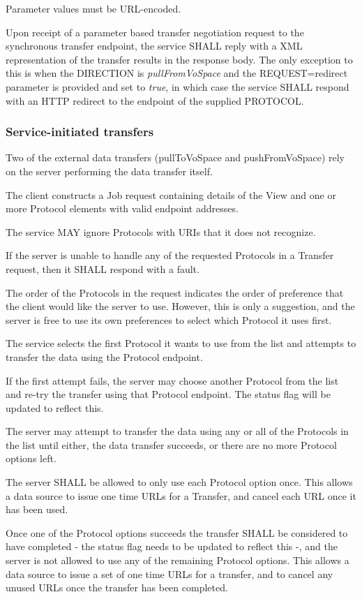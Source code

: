 \documentclass[11pt,a4paper]{ivoa}
\begin{document}
Parameter values must be URL-encoded.

Upon receipt of a parameter based transfer negotiation request to the synchronous transfer endpoint, the service SHALL reply with a XML representation of the transfer results in the response body.  The only exception to this is when the DIRECTION is \emph{pullFromVoSpace} and the REQUEST=redirect parameter is provided and set to \emph{true}, in which case the service SHALL respond with an HTTP redirect to the endpoint of the supplied PROTOCOL.

\subsubsection{Service-initiated transfers}
\label{subsubsec:service-initiated transfers}
Two of the external data transfers (pullToVoSpace and pushFromVoSpace) rely on the server performing the data transfer itself.

The client constructs a Job request containing details of the View and one or more Protocol elements with valid endpoint addresses.

The service MAY ignore Protocols with URIs that it does not recognize.

If the server is unable to handle any of the requested Protocols in a Transfer request, then it SHALL respond with a fault.

The order of the Protocols in the request indicates the order of preference that the client would like the server to use. However, this is only a suggestion, and the server is free to use its own preferences to select which Protocol it uses first.

The service selects the first Protocol it wants to use from the list and attempts to transfer the data using the Protocol endpoint.

If the first attempt fails, the server may choose another Protocol from the list and re-try the transfer using that Protocol endpoint. The status flag will be updated to reflect this.

The server may attempt to transfer the data using any or all of the Protocols in the list until either, the data transfer succeeds, or there are no more Protocol options left.

The server SHALL be allowed to only use each Protocol option once. This allows a data source to issue one time URLs for a Transfer, and cancel each URL once it has been used.

Once one of the Protocol options succeeds the transfer SHALL be considered to have completed - the status flag needs to be updated to reflect this -, and the server is not allowed to use any of the remaining Protocol options. This allows a data source to issue a set of one time URLs for a transfer, and to cancel any unused URLs once the transfer has been completed.
\end{document}
